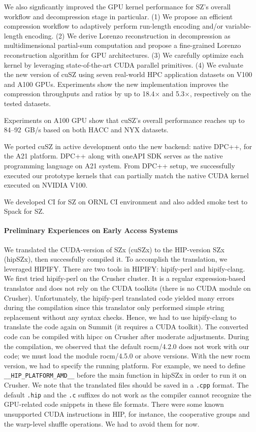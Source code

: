 We also signficantly improved the GPU kernel performance for SZ's overall workflow and decompression stage in particular. (1) We propose an efficient compression workflow to adaptively perform run-length encoding and/or variable-length encoding. (2) We derive Lorenzo reconstruction in decompression as multidimensional partial-sum computation and propose a fine-grained Lorenzo reconstruction algorithm for GPU architectures. (3) We carefully optimize each kernel by leveraging state-of-the-art CUDA parallel primitives. (4) We evaluate the new version of cuSZ using seven real-world HPC application datasets on V100 and A100 GPUs. Experiments show the new implementation improves the compression throughputs and ratios by up to 18.4$\times$ and 5.3$\times$, respectively on the tested datasets.

Experiments on A100 GPU show that cuSZ's overall performance reaches up to 84--92~GB/s based on both HACC and NYX datasets.

We ported cuSZ in active development onto the new backend: native DPC++, for the A21 platform. 
DPC++ along with oneAPI SDK serves as the native programming language on A21 system. From DPC++ setup, we successfully executed our prototype kernels that can partially match the native CUDA kernel executed on NVIDIA V100.

We developed CI for SZ on ORNL CI environment and also added smoke test to Spack for SZ. 

\paragraph{Preliminary Experiences on Early Access Systems}
We translated the CUDA-version of SZx (cuSZx) to the HIP-version SZx (hipSZx), then successfully compiled it. To accomplish the translation, we leveraged HIPIFY. There are two tools in HIPIFY: hipify-perl and hipify-clang. We first tried hipify-perl on the Crusher cluster. It is a regular expression-based translator and does not rely on the CUDA toolkits (there is no CUDA module on Crusher). Unfortunately, the hipify-perl translated code yielded many errors during the compilation since this translator only performed simple string replacement without any syntax checks. Hence, we had to use hipify-clang to translate the code again on Summit (it requires a CUDA toolkit). The converted code can be compiled with hipcc on Crusher after moderate adjustments. During the compilation, we observed that the default rocm/4.2.0 does not work with our code; we must load the module rocm/4.5.0 or above versions. With the new rocm version, we had to specify the running platform. For example, we need to define \texttt{\_\_HIP\_PLATFORM\_AMD\_\_} before the main function in hipSZx in order to run it on Crusher. We note that the translated files should be saved in a \texttt{.cpp} format. The default \texttt{.hip} and the \texttt{.c} suffixes do not work as the compiler cannot recognize the GPU-related code snippets in these file formats. There were some known unsupported CUDA instructions in HIP, for instance, the cooperative groups and the warp-level shuffle operations. We had to avoid them for now.

